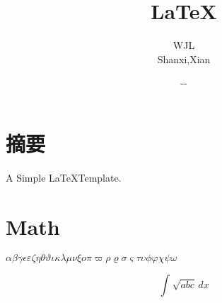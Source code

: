 \documentclass[UTF8]{ctexart}
\begin{document}


\renewcommand{\contentsname}{Contents}
\renewcommand{\bibname}{reference}

\renewcommand{\today}{\number\year-\number\month-\number\day}

\title{{\Huge \LaTeX \linebreak\linebreak}}
\author{\Large WJL \\ Shanxi,Xian}

\date{\today}

\maketitle

\newpage

\setcounter{secnumdepth}{4}
\tableofcontents
\newpage

\section*{摘要} 

A Simple \LaTeX Template.\cite{Article}


\section{Math}

$ \alpha \beta \gamma \epsilon \varepsilon \zeta \eta \theta \vartheta \iota \kappa \lambda \mu \nu \xi o \pi \varpi \rho \varrho \sigma \varsigma \tau \upsilon \phi \varphi \chi \psi \omega $


\begin{equation}
    \int_{}^{} \sqrt{abc}  \,dx 
\end{equation}


\end{document}
